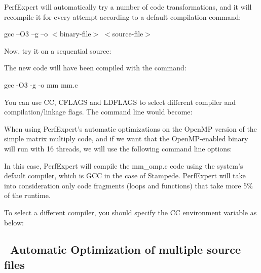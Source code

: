 PerfExpert will automatically try a number of code transformations, and it will recompile it for every attempt according to a default compilation command:

\begin{prompt}
gcc --O3 --g --o $<$binary-file$>$  $<$source-file$>$
\end{prompt}

Now, try it on a sequential source:

\begin{prompt}
\end{prompt}

The new code will have been compiled with the command:
\begin{prompt}
gcc -O3 -g -o mm mm.c
\end{prompt}

You can use CC, CFLAGS and LDFLAGS to select different compiler and compilation/linkage flags. The command line would become:
\begin{prompt}
\end{prompt}

When using PerfExpert's automatic optimizations on the OpenMP version of the simple matrix multiply code, and if we want that the OpenMP-enabled binary will run with 16 threads, we will use the following command line options:
\begin{prompt}
\end{prompt}

In this case, PerfExpert will compile the mm_omp.c code using the system's default compiler, which is GCC in the case of Stampede. PerfExpert will take into consideration only code fragments (loops and functions) that take more 5\% of the runtime.

To select a different compiler, you should specify the CC environment variable as below:
\begin{prompt}
\end{prompt}

\subsection{~Automatic Optimization of multiple source files}
\label{subsec:Automatic_Optimization_multiple}

